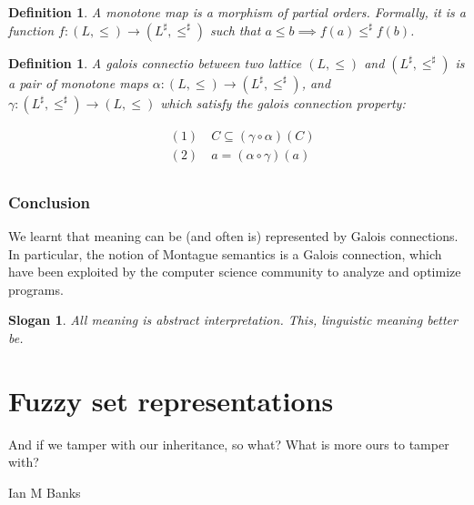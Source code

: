 \documentclass[11pt]{book}
\newtheorem{slogan}{Slogan}
\newtheorem{definition}[theorem]{Definition}
\begin{document}
\begin{definition}
    A monotone map is a morphism of partial orders. Formally,
it is a function $f: (L, \leq) \rightarrow (L^\sharp, \leq^\sharp)$ such that
$a \leq b \implies f(a) \leq^\sharp f(b)$.
\end{definition}

\begin{definition}
A galois connectio between two
lattice $(L, \leq)$ and $(L^\sharp, \leq^\sharp)$ is a pair of monotone maps
$\alpha: (L, \leq) \rightarrow (L^\sharp, \leq^\sharp)$, and
$\gamma: (L^\sharp, \leq^\sharp) \rightarrow  (L, \leq)$ which satisfy the
galois connection property:

\begin{align*}
    &(1) \quad C \subseteq (\gamma\circ \alpha)(C) \\
    &(2) \quad a = (\alpha \circ \gamma)(a) \\
\end{align*}
\end{definition}



\subsection{Conclusion}

We learnt that meaning can be (and often is) represented by Galois connections.
In particular, the notion of Montague semantics is a Galois connection, which have been
exploited by the computer science community to analyze and optimize programs.

\begin{slogan}
    All meaning is abstract interpretation. This, linguistic meaning better be.
\end{slogan}




\chapter{Fuzzy set representations}
\label{chapter:fuzzy-set-representation}

\epigraph{And if we tamper with our inheritance, so what? What is more ours to tamper with?}{Ian M Banks}
\end{document}
